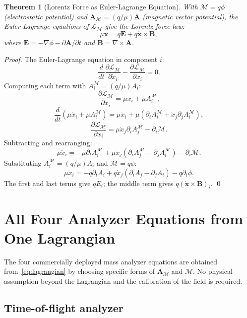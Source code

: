 \documentclass[twocolumn,10pt,a4paper]{article}
\theoremstyle{thmstyle}
\newtheorem{theorem}{Theorem}[section]
\theoremstyle{definition}
\theoremstyle{remark}
\newcommand{\LM}{\mathcal{L}_{\mathcal{M}}}
\newcommand{\AM}{\mathbf{A}_{\mathcal{M}}}
\newcommand{\Mop}{\mathcal{M}}
\begin{document}
\begin{theorem}[Lorentz Force as Euler-Lagrange Equation]
\label{thm:lorentz}
With $\Mop = q\phi$ (electrostatic potential) and
$\AM = (q/\mu)\mathbf{A}$ (magnetic vector potential),
the Euler-Lagrange equations of $\LM$ give the Lorentz force law:
\begin{equation}
\mu\ddot{\mathbf{x}} = q\mathbf{E} + q\dot{\mathbf{x}}\times\mathbf{B},
\label{eq:lorentz}
\end{equation}
where $\mathbf{E} = -\nabla\phi - \partial\mathbf{A}/\partial t$ and
$\mathbf{B} = \nabla\times\mathbf{A}$.
\end{theorem}

\begin{proof}
The Euler-Lagrange equation in component $i$:
\[
\frac{d}{dt}\frac{\partial\LM}{\partial\dot{x}_i} - \frac{\partial\LM}{\partial x_i} = 0.
\]
Computing each term with $A_i^{\mathcal{M}} = (q/\mu)A_i$:
\[
\frac{\partial\LM}{\partial\dot{x}_i} = \mu\dot{x}_i + \mu A_i^{\mathcal{M}},
\]
\[
\frac{d}{dt}(\mu\dot{x}_i + \mu A_i^{\mathcal{M}}) =
\mu\ddot{x}_i + \mu(\partial_t A_i^{\mathcal{M}} + \dot{x}_j\partial_j A_i^{\mathcal{M}}),
\]
\[
\frac{\partial\LM}{\partial x_i} = \mu\dot{x}_j\partial_i A_j^{\mathcal{M}} - \partial_i\Mop.
\]
Subtracting and rearranging:
\[
\mu\ddot{x}_i = -\mu\partial_t A_i^{\mathcal{M}} + \mu\dot{x}_j(\partial_i A_j^{\mathcal{M}} - \partial_j A_i^{\mathcal{M}}) - \partial_i\Mop.
\]
Substituting $A_i^{\mathcal{M}} = (q/\mu)A_i$ and $\Mop = q\phi$:
\[
\mu\ddot{x}_i = -q\partial_t A_i + q\dot{x}_j(\partial_i A_j - \partial_j A_i) - q\partial_i\phi.
\]
The first and last terms give $qE_i$; the middle term gives $q(\dot{\mathbf{x}}\times\mathbf{B})_i$. \qed
\end{proof}

\section{All Four Analyzer Equations from One Lagrangian}
\label{sec:analyzers}

The four commercially deployed mass analyzer equations are obtained
from~\eqref{eq:lagrangian} by choosing specific forms of $\AM$ and $\Mop$.
No physical assumption beyond the Lagrangian and the calibration of
the field is required.

\subsection{Time-of-flight analyzer}
\end{document}
